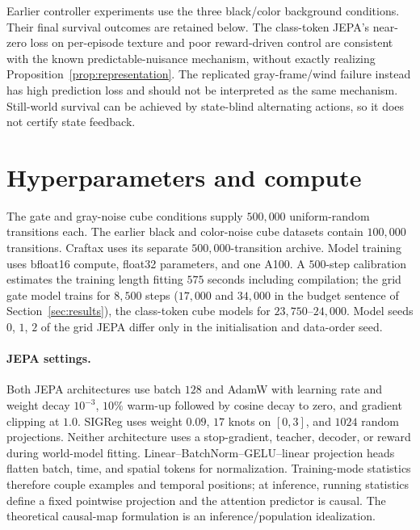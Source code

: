 Earlier controller experiments use the three black/color background conditions. Their final
survival outcomes are retained below. The class-token JEPA's near-zero loss on per-episode texture
and poor reward-driven control are consistent with the known predictable-nuisance mechanism,
without exactly realizing Proposition~\ref{prop:representation}. The replicated gray-frame/wind
failure instead has high prediction loss and should not be interpreted as the same mechanism.
Still-world survival can be achieved by state-blind alternating actions, so it does not certify
state feedback.

\begin{table}[ht]
\centering
\caption{Survival (percent) in the supplementary cube worlds. ``LeWM'' denotes the class-token JEPA;
``grid'' denotes the grid JEPA; ``goal'' and ``heads'' use latent-goal and learned-return search,
respectively. PPO columns use the final saved policies; ``px'' and ``z'' identify pixel and latent
observations. Still-world survival does not certify state feedback.}
\label{tab:cube}
\end{table}

\clearpage
\section{Hyperparameters and compute}
\label{app:hparams}

The gate and gray-noise cube conditions supply $500{,}000$ uniform-random transitions each. The earlier black and color-noise cube datasets contain $100{,}000$ transitions. Craftax uses its separate $500{,}000$-transition archive. Model training uses bfloat16 compute,
float32 parameters, and one A100. A $500$-step calibration estimates the training length fitting
$575$ seconds including compilation; the grid gate model trains for $8{,}500$ steps ($17{,}000$ and $34{,}000$ in the budget sentence of Section~\ref{sec:results}), the class-token cube models for $23{,}750$--$24{,}000$.
Model seeds $0$, $1$, $2$ of the grid JEPA differ only in the initialisation and data-order seed.

\paragraph{JEPA settings.}
Both JEPA architectures use batch $128$ and AdamW with learning rate and weight decay $10^{-3}$, $10\%$ warm-up
followed by cosine decay to zero, and gradient clipping at $1.0$. SIGReg uses weight $0.09$, $17$
knots on $[0,3]$, and $1024$ random projections. Neither architecture uses a stop-gradient, teacher, decoder, or
reward during world-model fitting. Linear--BatchNorm--GELU--linear projection heads flatten batch, time, and spatial tokens for normalization. Training-mode statistics therefore couple examples and temporal positions; at inference, running statistics define a fixed pointwise projection and the attention predictor is causal. The theoretical causal-map formulation is an inference/population idealization.

